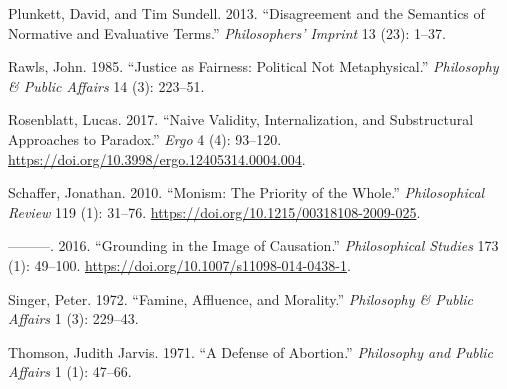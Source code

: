 \documentclass[
  12pt,
  letterpaper,
  DIV=11,
  numbers=noendperiod]{scrartcl}
\newlength{\cslhangindent}
\newenvironment{CSLReferences}[2] %
 {\begin{list}{}{%
  \setlength{\itemindent}{0pt}
  \setlength{\leftmargin}{0pt}
  \setlength{\parsep}{0pt}
  \ifodd #1
   \setlength{\leftmargin}{\cslhangindent}
   \setlength{\itemindent}{-1\cslhangindent}
  \fi
  \setlength{\itemsep}{#2\baselineskip}}}
 {\end{list}}
\begin{document}
\begin{CSLReferences}{1}{0}
Plunkett, David, and Tim Sundell. 2013. {``Disagreement and the
Semantics of Normative and Evaluative Terms.''} \emph{Philosophers'
Imprint} 13 (23): 1--37.

Rawls, John. 1985. {``Justice as Fairness: Political Not
Metaphysical.''} \emph{Philosophy \& Public Affairs} 14 (3): 223--51.

Rosenblatt, Lucas. 2017. {``Naive Validity, Internalization, and
Substructural Approaches to Paradox.''} \emph{Ergo} 4 (4): 93--120.
\url{https://doi.org/10.3998/ergo.12405314.0004.004}.

Schaffer, Jonathan. 2010. {``Monism: The Priority of the Whole.''}
\emph{Philosophical Review} 119 (1): 31--76.
\url{https://doi.org/10.1215/00318108-2009-025}.

---------. 2016. {``Grounding in the Image of Causation.''}
\emph{Philosophical Studies} 173 (1): 49--100.
\url{https://doi.org/10.1007/s11098-014-0438-1}.

Singer, Peter. 1972. {``Famine, Affluence, and Morality.''}
\emph{Philosophy \& Public Affairs} 1 (3): 229--43.

Thomson, Judith Jarvis. 1971. {``A Defense of Abortion.''}
\emph{Philosophy and Public Affairs} 1 (1): 47--66.

\end{CSLReferences}
\end{document}
